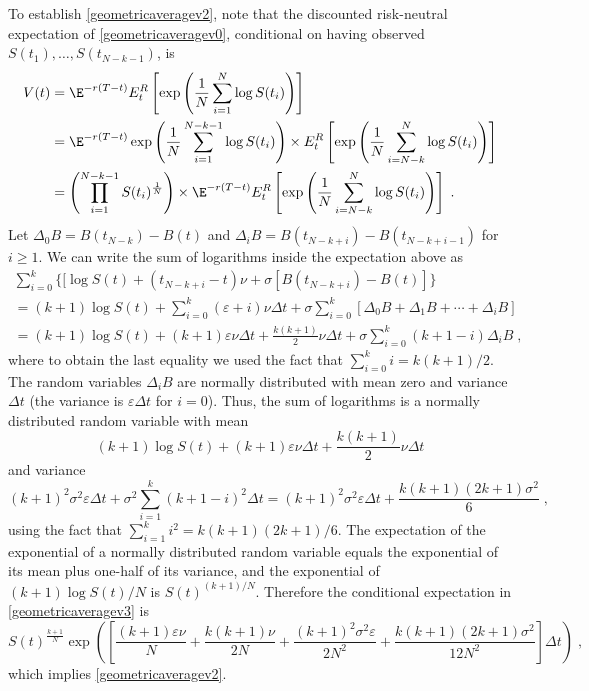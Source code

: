 \begin{petit}
To establish \eqref{geometricaveragev2}, note that the discounted risk-neutral expectation of \eqref{geometricaveragev0}, conditional on having observed $S(t_1), \ldots, S(t_{N-k-1})$, is
\begin{align}
V(t) &= \E^{-r(T-t)}E^R_t \left[\exp\left(\frac{1}{N} \sum_{i=1}^N \log S(t_i)\right)\right]\notag\\
&= \E^{-r(T-t)}\exp\left(\frac{1}{N}\sum_{i=1}^{N-k-1} \log S(t_i)\right)\times E^R_t \left[\exp\left(\frac{1}{N} \sum_{i=N-k}^N \log S(t_i)\right)\right]\notag\\
&=\left(\prod_{i=1}^{N-k-1}S(t_i)^{\frac{1}{N}}\right)\times \E^{-r(T-t)}E^R_t \left[\exp\left(\frac{1}{N} \sum_{i=N-k}^N \log S(t_i)\right)\right]\;.\label{geometricaveragev3}
\end{align}
Let  $\varDelta_0B = B(t_{N-k})-B(t)$ and $\varDelta_iB = B(t_{N\!-k+i})-B(t_{N\!-k+i-1})$ for $i \geq 1$.  We can write the sum of logarithms inside the expectation above as
\begin{multline*}
\sum_{i=0}^{k}\big\{[\log S(t) + (t_{N-k+i}-t)\nu + \sigma [B(t_{N-k+i})-B(t)]\big\}\\
=(k+1)\log S(t) + \sum_{i=0}^{k} (\varepsilon + i)\nu\varDelta t + \sigma\sum_{i=0}^{k} [\varDelta_0B + \varDelta_1B + \cdots + \varDelta_iB] \\
=(k+1)\log S(t) + (k+1)\varepsilon\nu\varDelta t + \frac{k(k+1)}{2}\nu\varDelta t + \sigma\sum_{i=0}^{k} (k+1-i)\varDelta_iB\;,
\end{multline*}
where to obtain the last equality we used the fact that $\sum_{i=0}^k i = k(k+1)/2$.
The random variables $\varDelta_iB$ are normally distributed with mean zero and variance $\varDelta t$ (the variance is $\varepsilon \varDelta t$ for $i=0$).  Thus, the sum of logarithms is
 a normally distributed random variable with mean
$$(k+1)\log S(t) + (k+1)\varepsilon\nu\varDelta t + \frac{k(k+1)}{2}\nu\varDelta t$$
and variance
$$(k+1)^2\sigma^2\varepsilon\varDelta t + \sigma^2\sum_{i=1}^{k} (k+1-i)^2\varDelta t = (k+1)^2\sigma^2\varepsilon\varDelta t +\frac{k(k+1)(2k+1)\sigma^2}{6}\; ,$$
using the fact that $\sum_{i=1}^k i^2 = k(k+1)(2k+1)/6$.
The expectation of the exponential of a normally distributed random variable equals the exponential of its mean plus one-half of its variance, and the exponential of $(k+1)\log S(t)/N$ is $S(t)^{(k+1)/N}$.  Therefore the conditional expectation in \eqref{geometricaveragev3} is
$$S(t)^{\frac{k+1}{N}}\exp\left(\left[ \frac{(k+1)\varepsilon\nu}{N}+ \frac{k(k+1)\nu}{2N} + \frac{(k+1)^2\sigma^2\varepsilon}{2N^2}+\frac{k(k+1)(2k+1)\sigma^2}{12N^2} \right]\varDelta t\right)\; ,$$
which implies \eqref{geometricaveragev2}.
\end{petit}

